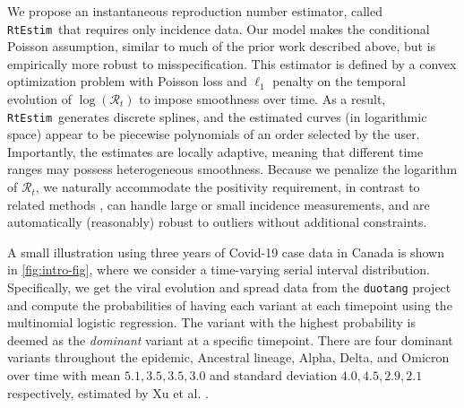 \documentclass[10pt,letterpaper]{article}
\def\RtEstim{\texttt{RtEstim}}
\def\calR{\mathcal{R}}
\begin{document}
We propose an instantaneous reproduction number estimator, 
called \RtEstim\ that requires only incidence data. Our model makes the
conditional Poisson assumption, similar to much of the prior work described
above, but is empirically more robust to misspecification. This estimator is 
defined by a convex optimization problem with Poisson loss and $\ell_1$ penalty 
on the temporal evolution of $\log(\calR_t)$ to impose smoothness over time. 
As a result, \RtEstim\ generates discrete splines, and the estimated curves (in
logarithmic space) appear to be piecewise polynomials of an order selected by the
user. Importantly, the estimates are locally adaptive, meaning that different
time ranges may possess heterogeneous smoothness. Because we penalize the
logarithm of $\calR_t$, we naturally accommodate the positivity requirement, in
contrast to related methods \cite{abry2020spatial,pascal2022nonsmooth}, can
handle large or small incidence measurements, and are automatically (reasonably)
robust to outliers without additional constraints. 

A small illustration using three years of Covid-19 case data in Canada \cite{CovidTimelineCanada} 
is shown in \autoref{fig:intro-fig}, where we consider a time-varying
serial interval distribution. Specifically, we get the viral evolution and spread data 
from the \texttt{duotang} project \cite{duotang_2023} and compute the 
probabilities of having each variant at each timepoint using the multinomial logistic 
regression. The variant with the highest probability is deemed as the \textit{dominant} variant
at a specific timepoint. There are four dominant variants throughout the epidemic, 
Ancestral lineage, Alpha, Delta, and Omicron over time with mean $5.1,3.5,3.5,3.0$ and 
standard deviation $4.0,4.5,2.9,2.1$ respectively, estimated by Xu et al. \cite{xu2023assessing}. 
\end{document}
